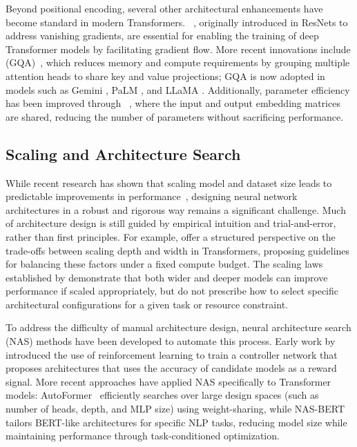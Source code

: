 Beyond positional encoding, several other architectural enhancements have become standard in modern Transformers. ~\citep{he2016deep}, originally introduced in ResNets to address vanishing gradients, are essential for enabling the training of deep Transformer models by facilitating gradient flow. More recent innovations include  (GQA)~\citep{ainslie2023gqa}, which reduces memory and compute requirements by grouping multiple attention heads to share key and value projections; GQA is now adopted in models such as Gemini \citep{deepmind2023gemini}, PaLM \citep{chowdhery2023palm}, and LLaMA \citep{touvron2023llama}. Additionally, parameter efficiency has been improved through ~\citep{press2017using}, where the input and output embedding matrices are shared, reducing the number of parameters without sacrificing performance.

\subsection{Scaling and Architecture Search}
While recent research has shown that scaling model and dataset size leads to predictable improvements in performance~\citep{kaplan2020scaling, henighan2020scaling}, designing neural network architectures in a robust and rigorous way remains a significant challenge. Much of architecture design is still guided by empirical intuition and trial-and-error, rather than first principles. For example, \citet{levine2020depth} offer a structured perspective on the trade-offs between scaling depth and width in Transformers, proposing guidelines for balancing these factors under a fixed compute budget. The scaling laws established by \citet{kaplan2020scaling} demonstrate that both wider and deeper models can improve performance if scaled appropriately, but do not prescribe how to select specific architectural configurations for a given task or resource constraint.

To address the difficulty of manual architecture design, neural architecture search (NAS) methods have been developed to automate this process. Early work by \citet{zoph2017neural} introduced the use of reinforcement learning to train a controller network that proposes architectures that uses the accuracy of candidate models as a reward signal. More recent approaches have applied NAS specifically to Transformer models: AutoFormer~\citep{chen2021autoformer} efficiently searches over large design spaces (such as number of heads, depth, and MLP size) using weight-sharing, while NAS-BERT~\citep{xu2021nasbert} tailors BERT-like architectures for specific NLP tasks, reducing model size while maintaining performance through task-conditioned optimization.

